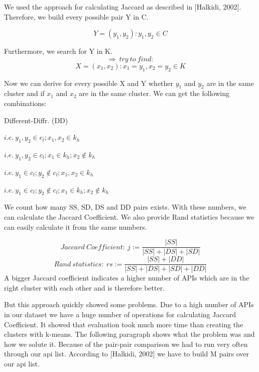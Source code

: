 \documentclass[a4paper]{IEEEtran}
\begin{document}
We used the approach for calculating Jaccard as described in [Halkidi, 2002]. Therefore, we build every possible pair Y in C.

\begin{equation*}
Y= ( y_1,y_2) : y_1, y_2 \in C
\end{equation*}

Furthermore, we search for Y in K. 
\begin{equation*}
\Rightarrow ~try~to~find:
\end{equation*}
\begin{equation*}
X= ( x_1,x_2) : x_1= y_1,x_2= y_2 \in K
\end{equation*}

Now we can derive for every possible X and Y whether $y_1$  and $y_2$ are in the same cluster and if $x_1$  and $x_2$ are in the same cluster. We can get the following combinations: \\
\begin{labeling}{Different-Diffr. (DD)}
\item [Same-same (SS)]  $i.e.~y_1,y_2 \in c_l; x_1,x_2∈k_h$ \\
\item [Same-Different (SD)]  $i.e.~ y_1,y_2 \in c_l; x_1 \in k_h; x_2 \notin k_h$ \\
\item [Different-Same (DS)]  $i.e.~ y_1 \in c_l; y_2 \notin c_l; x_1,x_2 \in k_h$ \\
\item [Different-Diffr. (DD)]  $i.e.~y_1 \in c_l; y_2 \notin c_l; x_1 \in k_h;x_2 \notin k_h$
\end{labeling}

We count how many SS, SD, DS and DD pairs exists. With these numbers, we can calculate the Jaccard Coefficient. We also provide Rand statistics because we can easily calculate it from the same numbers.

\begin{equation*}
Jaccard~Coefficient:~ j:= \frac{|SS|}{|SS|+|DS|+|SD|}
\end{equation*}
\begin{equation*}
Rand~statistics:~ rs:= \frac{|SS|+|DD|}{|SS|+|DS|+|SD|+|DD|}
\end{equation*}
A bigger Jaccard coefficient indicates a higher number of APIs which are in the right cluster with each other and is therefore better.

But this approach quickly showed some problems. Due to a high number of APIs in our dataset we have a huge number of operations for calculating Jaccard Coefficient. It showed that evaluation took much more time than creating the clusters with k-means. The following paragraph shows what the problem was and how we solute it.
Because of the pair-pair comparison we had to run very often through our api list. According to [Halkidi, 2002] we have to build M pairs over our api list.
\end{document}
